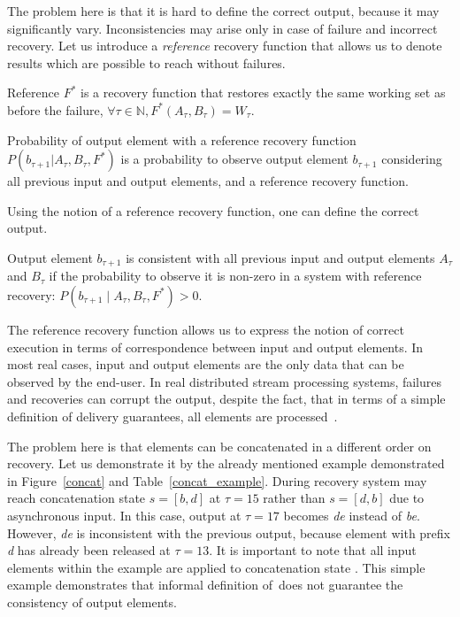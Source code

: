 The problem here is that it is hard to define the correct output, because it may significantly vary. Inconsistencies may arise only in case of failure and incorrect recovery. Let us introduce a {\em reference} recovery function that allows us to denote results which are possible to reach without failures.

\begin{definition}{Reference}
$F^{*}$ is a recovery function that restores exactly the same working set as before the failure, $\forall \tau \in \mathbb{N}, F^{*}(A_\tau,B_\tau)=W_\tau$.
\end{definition}

\begin{definition}{Probability of output element with a reference recovery function}
$P(b_{\tau+1}|A_{\tau}, B_\tau, F^{*})$ is a probability to observe output element $b_{\tau+1}$ considering all previous input and output elements, and a reference recovery function.
\end{definition}

Using the notion of a reference recovery function, one can define the correct output. 

\begin{definition}{Output element $b_{\tau+1}$ is consistent}
with all previous input and output elements $A_\tau$ and $B_\tau$ if the probability to observe it is non-zero in a system with reference recovery: $P(b_{\tau+1} \mid A_\tau,B_\tau,F^{*})>0$.
\end{definition}

The reference recovery function allows us to express the notion of correct execution in terms of correspondence between input and output elements. In most real cases, input and output elements are the only data that can be observed by the end-user. In real distributed stream processing systems, failures and recoveries can corrupt the output, despite the fact, that in terms of a simple definition of delivery guarantees, all elements are processed~\eo. 

The problem here is that elements can be concatenated in a different order on recovery. Let us demonstrate it by the already mentioned example demonstrated in Figure~\ref{concat} and Table~\ref{concat_example}. During recovery system may reach concatenation state $s=[b,d]$ at $\tau=15$ rather than $s=[d,b]$ due to asynchronous input. In this case, output at $\tau=17$ becomes {\em de} instead of {\em be}. However, {\em de} is inconsistent with the previous output, because element with prefix {\em d} has already been released at $\tau=13$. It is important to note that all input elements within the example are applied to concatenation state {\em \eo}. This simple example demonstrates that informal definition of\eo\ does not guarantee the consistency of output elements.


